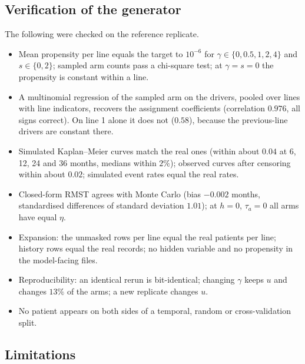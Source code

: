 \subsection{Verification of the generator}
\label{app:semisynthetic:verification}

The following were checked on the reference replicate.
\begin{itemize}
    \item Mean propensity per line equals the target to $10^{-6}$ for
    $\gamma\in\{0,0.5,1,2,4\}$ and $s\in\{0,2\}$; sampled arm counts pass a chi-square test;
    at $\gamma=s=0$ the propensity is constant within a line.
    \item A multinomial regression of the sampled arm on the drivers, pooled over lines with
    line indicators, recovers the assignment coefficients (correlation $0.976$, all signs
    correct). On line 1 alone it does not ($0.58$), because the previous-line drivers are
    constant there.
    \item Simulated Kaplan--Meier curves match the real ones (within about $0.04$ at 6, 12,
    24 and 36 months, medians within $2\%$); observed curves after censoring within about
    $0.02$; simulated event rates equal the real rates.
    \item Closed-form RMST agrees with Monte Carlo (bias $-0.002$ months, standardised
    differences of standard deviation $1.01$); at $h=0$, $\tau_a=0$ all arms have equal $\eta$.
    \item Expansion: the unmasked rows per line equal the real patients per line; history rows
    equal the real records; no hidden variable and no propensity in the model-facing files.
    \item Reproducibility: an identical rerun is bit-identical; changing $\gamma$ keeps $u$
    and changes $13\%$ of the arms; a new replicate changes $u$.
    \item No patient appears on both sides of a temporal, random or cross-validation split.
\end{itemize}

\subsection{Limitations}
\label{app:semisynthetic:limitations}

